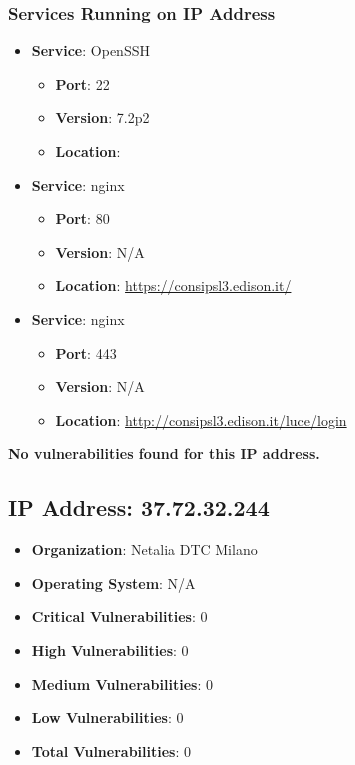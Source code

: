 \documentclass{article}
\begin{document}
\subsubsection*{Services Running on IP Address}

\begin{itemize}
    
        \item \textbf{Service}: OpenSSH
        \begin{itemize}
            \item \textbf{Port}: 22
            \item \textbf{Version}:  7.2p2 
            \item \textbf{Location}: \href{  }{  }
        \end{itemize}
    
        \item \textbf{Service}: nginx
        \begin{itemize}
            \item \textbf{Port}: 80
            \item \textbf{Version}:  N/A 
            \item \textbf{Location}: \href{ https://consipsl3.edison.it/ }{ https://consipsl3.edison.it/ }
        \end{itemize}
    
        \item \textbf{Service}: nginx
        \begin{itemize}
            \item \textbf{Port}: 443
            \item \textbf{Version}:  N/A 
            \item \textbf{Location}: \href{ http://consipsl3.edison.it/luce/login }{ http://consipsl3.edison.it/luce/login }
        \end{itemize}
    
\end{itemize}


\textbf{No vulnerabilities found for this IP address.}




\clearpage



\subsection{IP Address: 37.72.32.244}

\begin{itemize}
    \item \textbf{Organization}: Netalia DTC Milano
    \item \textbf{Operating System}:  N/A 
    \item \textbf{Critical Vulnerabilities}: 0
    \item \textbf{High Vulnerabilities}: 0
    \item \textbf{Medium Vulnerabilities}: 0
    \item \textbf{Low Vulnerabilities}: 0
    \item \textbf{Total Vulnerabilities}: 0
\end{itemize}
\end{document}

